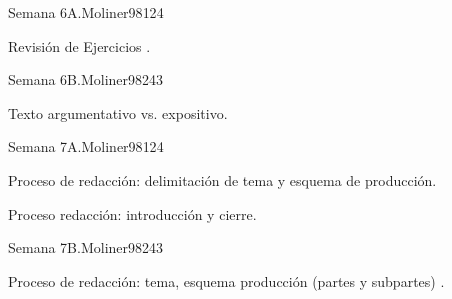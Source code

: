 \begin{syllabus}
\begin{unit}{Semana 6A.}{Moliner98}{12}{4}
   \begin{topics}
      \item Revisión de Ejercicios .
   \end{topics}
   \begin{unitgoals}
      \item 
   \end{unitgoals}
\end{unit}

\begin{unit}{Semana 6B.}{Moliner98}{24}{3}
   \begin{topics}
      \item Texto argumentativo vs. expositivo.
   \end{topics}

   \begin{unitgoals}
      \item 
      \item
      \item 
      \end{unitgoals}
\end{unit}

\begin{unit}{Semana 7A.}{Moliner98}{12}{4}
   \begin{topics}
      \item Proceso de redacción: delimitación de tema y esquema de producción.
      \item Proceso redacción: introducción y cierre.
   \end{topics}
   \begin{unitgoals}
      \item 
   \end{unitgoals}
\end{unit}

\begin{unit}{Semana 7B.}{Moliner98}{24}{3}
   \begin{topics}
      \item Proceso de redacción: tema, esquema producción (partes y subpartes) . 
   \end{topics}

   \begin{unitgoals}
      \item 
      \item
      \item 
      \end{unitgoals}
\end{unit}


\end{syllabus}
